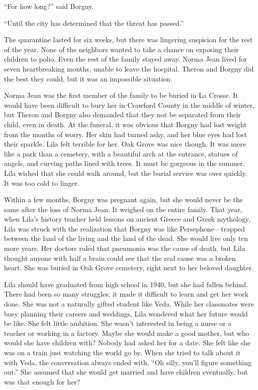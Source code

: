 \documentclass[
  letterpaper,
]{book}
\begin{document}
``For how long?'' said Borgny.

``Until the city has determined that the threat has passed.''

The quarantine lasted for six weeks, but there was lingering suspicion
for the rest of the year. None of the neighbors wanted to take a chance
on exposing their children to polio. Even the rest of the family stayed
away. Norma Jean lived for seven heartbreaking months, unable to leave
the hospital. Theron and Borgny did the best they could, but it was an
impossible situation.

Norma Jean was the first member of the family to be buried in La Crosse.
It would have been difficult to bury her in Crawford County in the
middle of winter, but Theron and Borgny also demanded that they not be
separated from their child, even in death. At the funeral, it was
obvious that Borgny had lost weight from the months of worry. Her skin
had turned ashy, and her blue eyes had lost their sparkle. Lila felt
terrible for her. Oak Grove was nice though. It was more like a park
than a cemetery, with a beautiful arch at the entrance, statues of
angels, and curving paths lined with trees. It must be gorgeous in the
summer. Lila wished that she could walk around, but the burial service
was over quickly. It was too cold to linger.

Within a few months, Borgny was pregnant again, but she would never be
the same after the loss of Norma Jean. It weighed on the entire family.
That year, when Lila's history teacher held lessons on ancient Greece
and Greek mythology, Lila was struck with the realization that Borgny
was like Persephone---trapped between the land of the living and the
land of the dead. She would live only ten more years. Her doctors ruled
that pneumonia was the cause of death, but Lila thought anyone with half
a brain could see that the real cause was a broken heart. She was buried
in Oak Grove cemetery, right next to her beloved daughter.

Lila should have graduated from high school in 1940, but she had fallen
behind. There had been so many struggles; it made it difficult to learn
and get her work done. She was not a naturally gifted student like Veda.
While her classmates were busy planning their careers and weddings, Lila
wondered what her future would be like. She felt little ambition. She
wasn't interested in being a nurse or a teacher or working in a factory.
Maybe she would make a good mother, but who would she have children
with? Nobody had asked her for a date. She felt like she was on a train
just watching the world go by. When she tried to talk about it with
Veda, the conversation always ended with, ``Oh silly, you'll figure
something out.'' She assumed that she would get married and have
children eventually, but was that enough for her?
\end{document}
